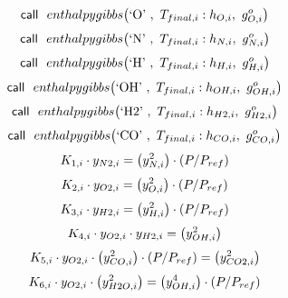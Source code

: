 \documentclass[10pt,fleqn]{article}
\newcommand{\F}[1]{\mbox{$#1$}}
\newcommand{\K}[1]{\mbox{\sf#1\ \ \mit}}
\newcommand{\SC}[1]{\mbox{`#1'}\  }
\newcommand{\I}{\mbox{\hspace{0.20in}}}
\begin{document}
\begin{equation}
\I \label{EES Eqn:41}
\K{call} \F{enthalpygibbs}{ \left( \SC{O},\ T_{final,i} : h_{O,i} ,\ g^{o}_{O,i} \right) } 
\end{equation}
\begin{equation}
\I \label{EES Eqn:42}
\K{call} \F{enthalpygibbs}{ \left( \SC{N},\ T_{final,i} : h_{N,i} ,\ g^{o}_{N,i} \right) } 
\end{equation}
\begin{equation}
\I \label{EES Eqn:43}
\K{call} \F{enthalpygibbs}{ \left( \SC{H},\ T_{final,i} : h_{H,i} ,\ g^{o}_{H,i} \right) } 
\end{equation}
\begin{equation}
\I \label{EES Eqn:44}
\K{call} \F{enthalpygibbs}{ \left( \SC{OH},\ T_{final,i} : h_{OH,i} ,\ g^{o}_{OH,i} \right) } 
\end{equation}
\begin{equation}
\I \label{EES Eqn:45}
\K{call} \F{enthalpygibbs}{ \left( \SC{H2},\ T_{final,i} : h_{H2,i} ,\ g^{o}_{H2,i} \right) } 
\end{equation}
\begin{equation}
\I \label{EES Eqn:46}
\K{call} \F{enthalpygibbs}{ \left( \SC{CO},\ T_{final,i} : h_{CO,i} ,\ g^{o}_{CO,i} \right) } 
\end{equation}
\begin{equation}
\I \label{EES Eqn:47}
K_{1,i}   \cdot    y_{N2,i	}=        \left( y_{N,i}^{2} \right)    \cdot     \left( P/P_{ref} \right)  
\end{equation}
\begin{equation}
\I \label{EES Eqn:48}
K_{2,i}   \cdot    y_{O2,i	}=        \left( y_{O,i}^{2} \right)    \cdot     \left( P/P_{ref} \right)  
\end{equation}
\begin{equation}
\I \label{EES Eqn:49}
K_{3,i}   \cdot    y_{H2,i	}=        \left( y_{H,i}^{2} \right)    \cdot     \left( P/P_{ref} \right)  
\end{equation}
\begin{equation}
\I \label{EES Eqn:50}
K_{4,i}   \cdot    y_{O2,i}   \cdot    y_{H2,i	}=        \left( y_{OH,i}^{2} \right)  
\end{equation}
\begin{equation}
\I \label{EES Eqn:51}
K_{5,i}   \cdot    y_{O2,i}   \cdot     \left( y_{CO,i}^{2} \right)    \cdot     \left( P/P_{ref} \right) 	=        \left( y_{CO2,i}^{2} \right)  
\end{equation}
\begin{equation}
\I \label{EES Eqn:52}
K_{6,i}   \cdot    y_{O2,i}   \cdot     \left( y_{H2O,i}^{2} \right) 	=        \left( y_{OH,i}^{4} \right)    \cdot     \left( P/P_{ref} \right)  
\end{equation}
\end{document}
